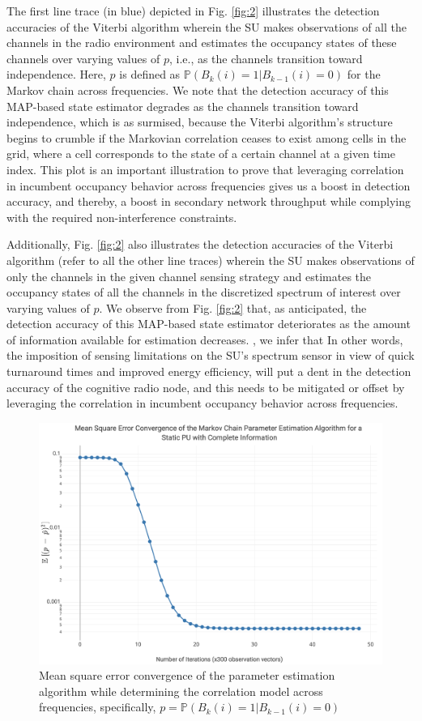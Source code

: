 \documentclass[10pt,twocolumn]{IEEEtran}
\begin{document}
The first line trace (in blue) depicted in Fig. \ref{fig:2} illustrates the detection accuracies of the Viterbi algorithm wherein the SU makes observations of all the channels in the radio environment and estimates the occupancy states of these channels over varying values of $p$, i.e., as the channels transition toward independence. Here, $p$ is defined as $\mathbb{P}(B_{k}(i){=}1|B_{k-1}(i){=}0)$ for the Markov chain across frequencies. We note that the detection accuracy of this MAP-based state estimator degrades as the channels transition toward independence, which is as surmised, because the Viterbi algorithm's structure begins to crumble if the Markovian correlation ceases to exist among cells in the grid, where a cell corresponds to the state of a certain channel at a given time index. This plot is an important illustration to prove that leveraging correlation in incumbent occupancy behavior across frequencies gives us a boost in detection accuracy, and thereby, a boost in secondary network throughput while complying with the required non-interference constraints.

Additionally, Fig. \ref{fig:2} also illustrates the detection accuracies of the Viterbi algorithm (refer to all the other line traces) wherein the SU makes observations of only the channels in the given channel sensing strategy and estimates the occupancy states of all the channels in the discretized spectrum of interest over varying values of $p$. We observe from Fig. \ref{fig:2} that, as anticipated, the detection accuracy of this MAP-based state estimator deteriorates as the amount of information available for estimation decreases. , we infer that In other words, the imposition of sensing limitations on the SU's spectrum sensor in view of quick turnaround times and improved energy efficiency, will put a dent in the detection accuracy of the cognitive radio node, and this needs to be mitigated or offset by leveraging the correlation in incumbent occupancy behavior across frequencies.
\begin{figure}
    \centering
    \includegraphics[width=0.95\linewidth]{ParameterEstimatorConvergence.png}
    \caption{Mean square error convergence of the parameter estimation algorithm while determining the correlation model across frequencies, specifically, $p{=}\mathbb{P}(B_{k}(i){=}1|B_{k-1}(i){=}0)$}
    \label{fig:4}
\end{figure}
\end{document}

